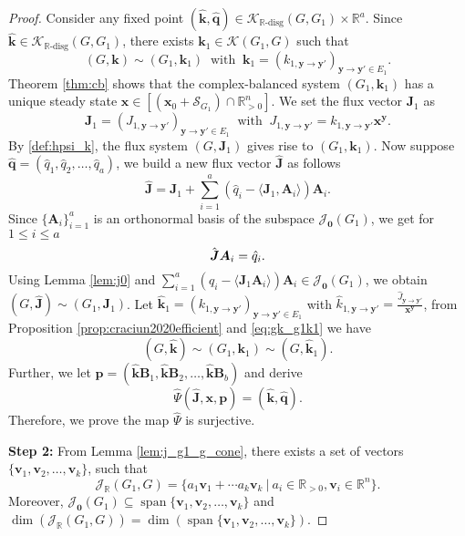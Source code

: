 \documentclass[11pt]{article}
\theoremstyle{plain}
\theoremstyle{definition}
\theoremstyle{remark}
\newcommand\RR{\mathbb{R}}
\newcommand\by{\boldsymbol{y}}
\newcommand\bk{\boldsymbol{k}}
\newcommand\bx{\boldsymbol{x}}
\newcommand\bv{\boldsymbol{v}}
\newcommand\bA{\boldsymbol{A}}
\newcommand\bB{\boldsymbol{B}}
\newcommand\bq{\boldsymbol{q}}
\newcommand\bp{\boldsymbol{p}}
\newcommand\bJ{\boldsymbol{J}}
\newcommand\hbJ{\hat{\boldsymbol{J}}}
\newcommand{\mK}{\mathcal{K}}
\newcommand{\dK}{\mathcal{K}_{\RR\text{-disg}}}
\newcommand{\mJ}{\mathcal{J}_{\RR}}
\newcommand{\eJ}{\mathcal{J}_{\textbf{0}}}
\newcommand{\mS}{\mathcal{S}}
\newcommand{\hbk}{\hat{\bk}}
\newcommand{\hbq}{\hat{\bq}}
\DeclareMathOperator{\spn}{span}
\begin{document}
\begin{proof}
Consider any fixed point $(\hbk, \hbq) \in \dK(G,G_1)\times \RR^a$.
Since $\hbk \in \dK (G, G_1)$, there exists $\bk_1 \in \mK (G_1, G)$ such that
\begin{equation} \label{eq:gk_g1k1}
(G, \bk) \sim (G_1, \bk_1) 
\ \text{ with } \ \bk_1 = (k_{1, \by\rightarrow \by'})_{\by\rightarrow \by' \in E_1}.
\end{equation}
Theorem \ref{thm:cb} shows that the complex-balanced system $(G_1, \bk_1)$ has a unique steady state $\bx \in [(\bx_0 + \mS_{G_1} )\cap\mathbb{R}^n_{>0}]$. 
We set the flux vector $\bJ_1$ as 
\[
\bJ_1 = (J_{1, \by\rightarrow \by'})_{\by\rightarrow \by' \in E_1}
\ \text{ with } \ J_{1, \by\rightarrow \by'} = k_{1, \by\rightarrow \by'} {\bx}^{\by}.
\]
By \eqref{def:hpsi_k}, the flux system $(G, \bJ_1)$ gives rise to $(G_1, \bk_1)$.
Now suppose $\hbq = (\hat{q}_1, \hat{q}_2, \ldots, \hat{q}_a)$, we build a new flux vector $\hbJ$ as follows
\[
\hbJ = \bJ_1 + \sum\limits^{a}_{i=1} (\hat{q}_i - \langle \bJ_1, \bA_i \rangle ) \bA_i.
\]
Since $\{ \bA_i \}^a_{i=1}$ is an orthonormal basis of the subspace $\eJ(G_1)$, we get for $1 \leq i \leq a$
\begin{equation} \notag
\hbJ \bA_i = \hat{q}_i.
\end{equation}
Using Lemma \ref{lem:j0} and $\sum\limits^{a}_{i=1} (\hat{q}_i - \langle\bJ_1 \bA_i\rangle ) \bA_i \in \eJ(G_1)$, we obtain
$(G, \hbJ) \sim (G_1, \bJ_1)$. Let $\hbk_1 = (k_{1, \by\rightarrow \by'})_{\by\rightarrow \by' \in E_1}$ with $\hat{k}_{1, \by\rightarrow \by'} = \frac{\hat{J}_{\by\rightarrow \by'}}{{\bx}^{\by}}$, from Proposition \ref{prop:craciun2020efficient} and \eqref{eq:gk_g1k1} we have
\[
(G, \hbk) \sim (G_1, \bk_1) \sim (G, \hbk_1).
\]
Further, we let $\bp = (\hat{\bk} \bB_1, \hat{\bk} \bB_2, \ldots, \hat{\bk} \bB_b)$ and derive
\[
\hat{\Psi} (\hat{\bJ},\bx, \bp) = (\hat{\bk}, \hat{\bq}).
\]
Therefore, we prove the map $\hat{\Psi}$ is surjective. 

\medskip

\textbf{Step 2: }
From Lemma \ref{lem:j_g1_g_cone}, there exists a set of vectors $\{ \bv_1, \bv_2, \ldots, \bv_k \}$, such that
\[
\mJ (G_1, G) = \{ a_1 \bv_1 + \cdots a_k \bv_k \ | \ a_i \in \RR_{>0}, \bv_i \in \RR^n\}.
\]
Moreover, $\eJ(G_1) \subseteq \spn \{ \bv_1, \bv_2, \ldots, \bv_k \}$ and
$\dim (\mJ (G_1, G)) =\dim ( \spn \{ \bv_1, \bv_2, \ldots, \bv_k \} )$.


\end{proof}
\end{document}
